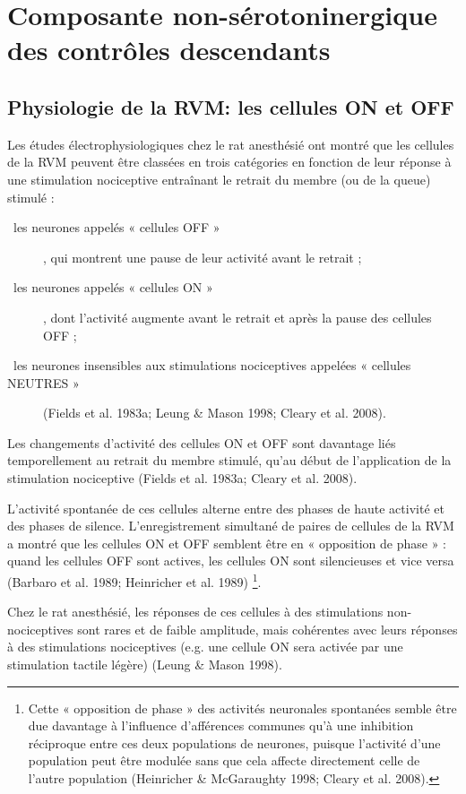 \documentclass[a4paper,12pt,twoside]{report}
\begin{document}
\section{Composante non-sérotoninergique des contrôles descendants}

\subsection{Physiologie de la RVM: les cellules ON et OFF}

Les études électrophysiologiques chez le rat anesthésié ont montré que les cellules de la RVM peuvent être classées en trois catégories en fonction de leur réponse à une stimulation nociceptive entraînant le retrait du membre (ou de la queue) stimulé :

\begin{description}
\item [\textbullet~les neurones appelés « cellules OFF »], qui montrent une pause de leur activité avant le retrait ;
\item [\textbullet~les neurones appelés « cellules ON »], dont l’activité augmente avant le retrait et après la pause des cellules OFF ;
\item [\textbullet~les neurones insensibles aux stimulations nociceptives appelées « cellules NEUTRES »] (Fields et al. 1983a; Leung \& Mason 1998; Cleary et al. 2008). 
\end{description}

Les changements d’activité des cellules ON et OFF sont davantage liés temporellement au retrait du membre stimulé, qu’au début de l’application de la stimulation nociceptive (Fields et al. 1983a; Cleary et al. 2008).

L’activité spontanée de ces cellules alterne entre des phases de haute activité et des phases de silence. L’enregistrement simultané de paires de cellules de la RVM a montré que les cellules ON et OFF semblent être en « opposition de phase » : quand les cellules OFF sont actives, les cellules ON sont silencieuses et vice versa (Barbaro et al. 1989; Heinricher et al. 1989)
\footnote{Cette « opposition de phase » des activités neuronales spontanées semble être due davantage à l’influence d’afférences communes qu’à une inhibition réciproque entre ces deux populations de neurones, puisque l’activité d’une population peut être modulée sans que cela affecte directement celle de l’autre population (Heinricher \& McGaraughty 1998; Cleary et al. 2008).}.

Chez le rat anesthésié, les réponses de ces cellules à des stimulations non-nociceptives sont rares et de faible amplitude, mais cohérentes avec leurs réponses à des stimulations nociceptives (e.g. une cellule ON sera activée par une stimulation tactile légère) (Leung \& Mason 1998).
\end{document}
